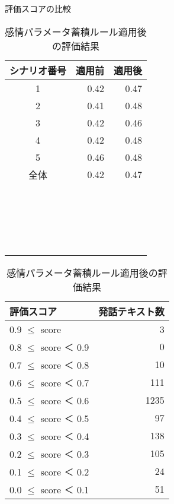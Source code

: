 \documentclass[japanese]{jnlp_1.3c}
\begin{document}
\begin{table}[t]
\begin{minipage}{0.4\textwidth}
\begin{center}
\caption{評価スコアの比較}
\begin{tabular}{|c|r|r|}
\hline
シナリオ番号 & 適用前 & 適用後 \\ \hline \hline
1	&	0.42	&	0.47 \\ \hline
2	&	0.41	&	0.48 \\ \hline
3	&	0.42	&	0.46 \\ \hline
4	&	0.42	&	0.48 \\ \hline
5	&	0.46	&	0.48 \\ \hline
\hline
全体	&	0.42	&	0.47	\\ \hline
\multicolumn{3}{c}{　}\\
\multicolumn{3}{c}{　}\\
\multicolumn{3}{c}{　}\\
\multicolumn{3}{c}{　}
\end{tabular}
\label{tb:score_comp}
\end{center}
\end{minipage}
\hfill
\begin{minipage}{0.5\textwidth}
\begin{center}
\caption{感情パラメータ蓄積ルール適用後の評価結果}
\begin{tabular}{|l|r|}
\hline
評価スコア & 発話テキスト数 \\ \hline \hline
0.9 $\leq$ score	&	3	\\ \hline
0.8 $\leq$ score ＜ 0.9 & 0	\\ \hline
0.7 $\leq$ score ＜ 0.8 &	10	\\ \hline
0.6 $\leq$ score ＜ 0.7 &	111	\\ \hline
0.5 $\leq$ score ＜ 0.6 &	1235	\\ \hline
0.4 $\leq$ score ＜ 0.5 &	97	\\ \hline
0.3 $\leq$ score ＜ 0.4 &	138	\\ \hline
0.2 $\leq$ score ＜ 0.3 &	105	\\ \hline
0.1 $\leq$ score ＜ 0.2 &	24	\\ \hline
0.0 $\leq$ score ＜ 0.1 &	51	\\ \hline
\end{tabular}
\label{tb:paraHyoka}
\end{center}
\end{minipage}
\end{table}
\end{document}

